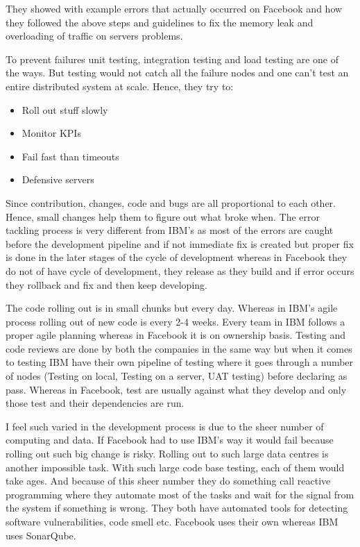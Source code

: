 They showed with example errors that actually occurred on Facebook and how they followed the above steps and guidelines to fix the memory leak and overloading of traffic on servers problems.

To prevent failures unit testing, integration testing and load testing are one of the ways. But testing would not catch all the failure nodes and one can't test an entire distributed system at scale. Hence, they try to:
\begin{itemize}
      \item Roll out stuff slowly
      \item Monitor KPIs
      \item Fail fast than timeouts
      \item Defensive servers
\end{itemize}

Since contribution, changes, code and bugs are all proportional to each other. Hence, small changes help them to figure out what broke when. The error tackling process is very different from IBM's as most of the errors are caught before the development pipeline and if not immediate fix is created but proper fix is done in the later stages of the cycle of development whereas in Facebook they do not of have cycle of development, they release as they build and if error occurs they rollback and fix and then keep developing.

The code rolling out is in small chunks but every day. Whereas in IBM's agile process rolling out of new code is every 2-4 weeks. Every team in IBM follows a proper agile planning whereas in Facebook it is on ownership basis. Testing and code reviews are done by both the companies in the same way but when it comes to testing IBM have their own pipeline of testing where it goes through a number of nodes (Testing on local, Testing on a server, UAT testing) before declaring as pass. Whereas in Facebook, test are usually against what they develop and only those test and their dependencies are run.

I feel such varied in the development process is due to the sheer number of computing and data. If Facebook had to use IBM's way it would fail because rolling out such big change is risky. Rolling out to such large data centres is another impossible task. With such large code base testing, each of them would take ages. And because of this sheer number they do something call reactive programming where they automate most of the tasks and wait for the signal from the system if something is wrong. They both have automated tools for detecting software vulnerabilities, code smell etc. Facebook uses their own whereas IBM uses SonarQube.

